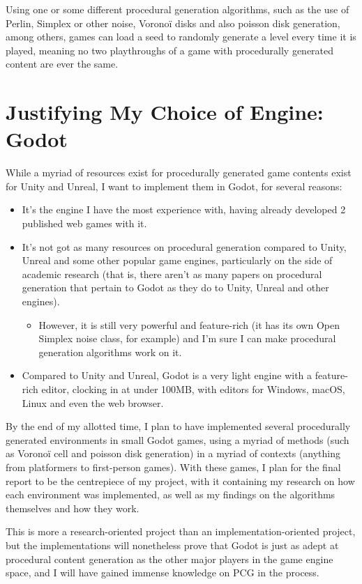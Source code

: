 Using one or some different procedural generation algorithms, such as the use of Perlin, Simplex or other noise, Voronoï disks and also poisson disk generation, among others, games can load a seed to randomly generate a level every time it is played, meaning no two playthroughs of a game with procedurally generated content are ever the same.

\section{Justifying My Choice of Engine: Godot}

While a myriad of resources exist for procedurally generated game contents exist for Unity and Unreal, I want to implement them in Godot, for several reasons:

\begin{itemize}
	\item It's the engine I have the most experience with, having already developed 2 published web games with it.
	\item It's not got as many resources on procedural generation compared to Unity, Unreal and some other popular game engines, particularly on the side of academic research (that is, there aren't as many papers on procedural generation that pertain to Godot as they do to Unity, Unreal and other engines).
	\begin{itemize}
		\item However, it is still very powerful and feature-rich (it has its own Open Simplex noise class, for example) and I'm sure I can make procedural generation algorithms work on it.
	\end{itemize}
	\item Compared to Unity and Unreal, Godot is a very light engine with a feature-rich editor, clocking in at under 100MB, with editors for Windows, macOS, Linux and even the web browser. 
\end{itemize}

By the end of my allotted time, I plan to have implemented several procedurally generated environments in small Godot games, using a myriad of methods (such as Voronoï cell and poisson disk generation) in a myriad of contexts (anything from platformers to first-person games). With these games, I plan for the final report to be the centrepiece of my project, with it containing my research on how each environment was implemented, as well as my findings on the algorithms themselves and how they work.

This is more a research-oriented project than an implementation-oriented project, but the implementations will nonetheless prove that Godot is just as adept at procedural content generation as the other major players in the game engine space, and I will have gained immense knowledge on PCG in the process.

